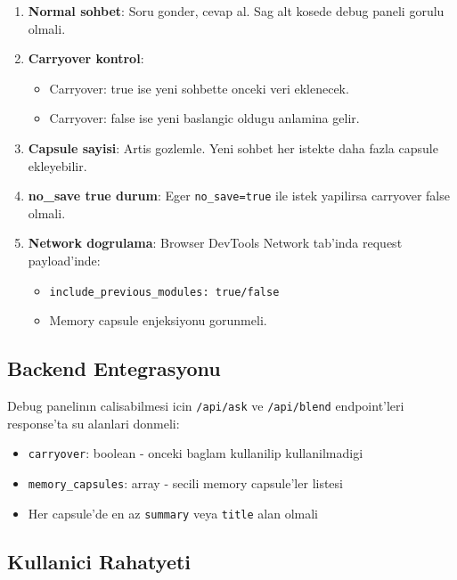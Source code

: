 \documentclass[11pt,a4paper]{article}
\begin{document}
{\begin{enumerate}[leftmargin=1.5em]
	\item \textbf{Normal sohbet}: Soru gonder, cevap al. Sag alt kosede debug paneli gorulu olmali.
	\item \textbf{Carryover kontrol}: 
	\begin{itemize}[leftmargin=1.5em]
		\item Carryover: true ise yeni sohbette onceki veri eklenecek.
		\item Carryover: false ise yeni baslangic oldugu anlamina gelir.
	\end{itemize}
	\item \textbf{Capsule sayisi}: Artis gozlemle. Yeni sohbet her istekte daha fazla capsule ekleyebilir.
	\item \textbf{no\_save true durum}: Eger \texttt{no\_save=true} ile istek yapilirsa carryover false olmali.
	\item \textbf{Network dogrulama}: Browser DevTools Network tab'inda request payload'inde:
	\begin{itemize}[leftmargin=1.5em]
		\item \texttt{include\_previous\_modules: true/false}
		\item Memory capsule enjeksiyonu gorunmeli.
	\end{itemize}
\end{enumerate}

\subsection{Backend Entegrasyonu}

Debug panelinın calisabilmesi icin \texttt{/api/ask} ve \texttt{/api/blend} endpoint'leri response'ta su alanlari donmeli:

\begin{itemize}[leftmargin=1.5em]
	\item \texttt{carryover}: boolean - onceki baglam kullanilip kullanilmadigi
	\item \texttt{memory\_capsules}: array - secili memory capsule'ler listesi
	\item Her capsule'de en az \texttt{summary} veya \texttt{title} alan olmali
\end{itemize}

\subsection{Kullanici Rahatyeti}

}
\end{document}
